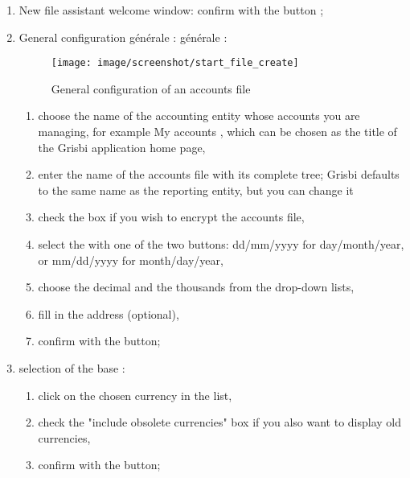 \begin{enumerate}
\item New file assistant welcome window: confirm with the  button ;
\item General configuration
\ifIllustration générale :
\else générale :
\fi

\ifIllustration
\begin{figure}[htbp]
\begin{center}
\texttt{[image: image/screenshot/start\_file\_create]}
\end{center}
\caption{General configuration of an accounts file}
\label{start-file-create-img}
\end{figure}
\fi

\begin{enumerate} 
 \item choose the name of the accounting entity whose accounts you are managing, for example \og My accounts \fg{}, which can be chosen as the title of the Grisbi application home page,
\item enter the name of the accounts file with its complete tree; Grisbi defaults to the same name as the reporting entity, but you can change it
\item check the   box if you wish to \gls{encrypt} the accounts file,
\item select the  with one of the two buttons: dd/mm/yyyy for day/month/year, or  mm/dd/yyyy for month/day/year,
\item choose the decimal  and the thousands from the drop-down lists,
 \item fill in the address (optional),
 \item  confirm with the   button;
\end{enumerate}

\item selection of the base  :
\begin{enumerate} 
 \item click on the chosen currency in the list,
\item check the "include obsolete currencies" box if you also want to display old currencies,
\item confirm with the  button;
\end{enumerate}


\end{enumerate}
